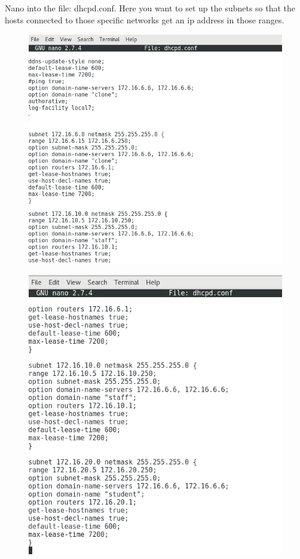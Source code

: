 \documentclass{article}
\begin{document}
\subsection{}
Nano into the file: dhcpd.conf. Here you want to set up the subnets so that the hosts connected to those specific networks get an ip address in those ranges.
\begin{figure}[h]
	\centering
	\includegraphics[width=1\linewidth]{dhcp-config2}
\end{figure}
\newpage
\begin{figure}[h]
	\centering
	\includegraphics[width=1\linewidth]{dhcp-config3}
\end{figure}
\newpage
\end{document}
